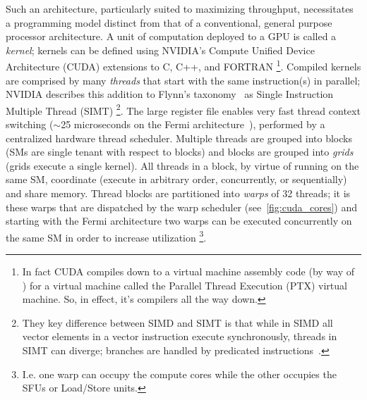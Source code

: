\documentclass[sigconf]{acmart}
\begin{document}
Such an architecture, particularly suited to maximizing throughput, necessitates a programming model distinct from that of a conventional, general purpose processor architecture.
A unit of computation deployed to a GPU is called a \textit{kernel}; kernels can be defined using NVIDIA's Compute Unified Device Architecture (CUDA) extensions to C, C++, and FORTRAN%
\footnote{In fact CUDA compiles down to a virtual machine assembly code (by way of ) for a virtual machine called the Parallel Thread Execution (PTX) virtual machine. So, in effect, it's compilers all the way down.}.
Compiled kernels are comprised by many \textit{threads} that start with the same instruction(s) in parallel;
NVIDIA describes this addition to Flynn's taxonomy~\cite{5009071} as Single Instruction Multiple Thread (SIMT)%
\footnote{They key difference between SIMD and SIMT is that while in SIMD all vector elements in a vector instruction execute synchronously, threads in SIMT can diverge; branches are handled by predicated instructions~\cite{cuda_toolkit}.}.
The large register file enables very fast thread context switching ($\sim$25 microseconds on the Fermi architecture~\cite{Glaskowsky2009NVIDIAS}), performed by a centralized hardware thread scheduler.
Multiple threads are grouped into blocks (SMs are single tenant with respect to blocks) and blocks are grouped into \textit{grids} (grids execute a single kernel).
All threads in a block, by virtue of running on the same SM, coordinate (execute in arbitrary order, concurrently, or sequentially) and share memory.
Thread blocks are partitioned into \textit{warps} of 32 threads;
it is these warps that are dispatched by the warp scheduler (see~\cref{fig:cuda_cores}) and starting with the Fermi architecture two warps can be executed concurrently on the same SM in order to increase utilization%
\footnote{I.e. one warp can occupy the compute cores while the other occupies the SFUs or Load/Store units.}.


\end{document}
